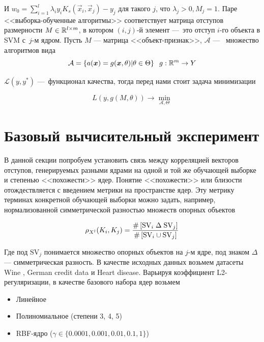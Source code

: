 \documentclass[12pt,twoside]{article}
\renewcommand{\L}{\mathcal{L}}
\begin{document}
И $w_0 = \sum_{i=1}^l \lambda_i y_i K_s(\vec{x}_i, \vec{x}_j) - y_j$ для такого $j$, что
$\lambda_j > 0, M_j = 1$. Паре <<выборка-обученные алгоритмы>> соответствует матрица отступов размерности
$M \in \R^{l\times m}$,
в котором $(i, j)$-й элемент ---~это отступ $i$-го объекта в SVM с~$j$-м ядром.
Пусть $M$ --- матрица <<объект-признак>>, $\mathcal{A}$ ---~ множество алгоритмов
вида
\begin{equation}
    \mathcal{A} = \left\{a(\boldsymbol{x}) = g(\boldsymbol{x}, \theta)|\theta \in \Theta\right\}\;\; g:\mathbb{R}^m \to Y
\end{equation}

$\L(y, y^*)$ ---~функционал качества, тогда перед нами стоит задача минимизации

\begin{equation}
    L(y, g(M, \theta)) \to \min_{\mathcal{A}, \Theta}
\end{equation}


\section{Базовый вычисительный эксперимент}

В данной секции попробуем установить связь между корреляцией векторов отступов,
генерируемых
разными ядрами на одной и той же обучающей выборке и степенью <<похожести>>
ядер. Понятие <<похожести>> или близости отождествляется с введением метрики
на пространстве ядер. Эту метрику терминах конкретной обучающей выборки можно
задать, например, нормализованной симметрической разностью множеств опорных объектов

$$
\rho_{X^l}(K_i, K_j) = \frac{\#\left[\mathrm{SV}_i \;\Delta\; \mathrm{SV}_j\right]}
{\#\left[\mathrm{SV}_i \cup \mathrm{SV}_j\right]}
$$

Где под $\mathrm{SV}_j$ понимается множество опорных объектов на $j$-м ядре, под
знаком $\Delta$ --- симметрическая разность. В качестве исходных данных
возьмем датасеты Wine \cite{UCI:Wine}, German credit data\cite{UCI:German} и
Heart disease\cite{UCI:Heart}. Варьируя коэффициент L2-регуляризации, в качестве базового набора ядер возьмем

\begin{itemize}
    \item Линейное
    \item Полиномиальное (степени 3, 4, 5)
    \item RBF-ядро ($\gamma \in \{0.0001, 0.001, 0.01, 0.1, 1\}$)
\end{itemize}
\end{document}
